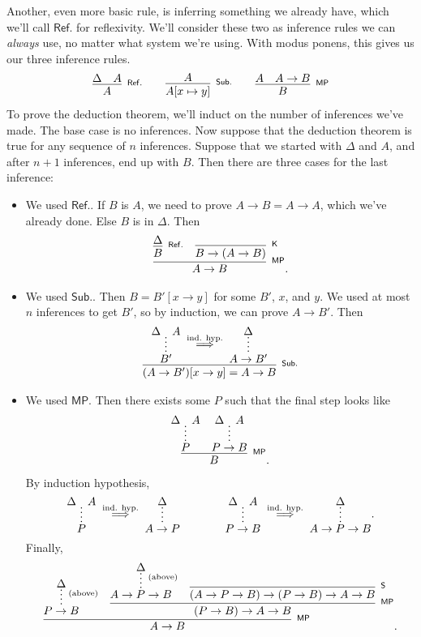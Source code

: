 \documentclass[11pt,paper=letter]{scrartcl}
\renewcommand{\sf}{\mathsf}
\newcommand{\vc}[1]{\vcenter{\hbox{#1}}}
\begin{document}
Another, even more basic rule, is inferring something we already have, which we'll call $\sf{Ref.}$ for reflexivity. We'll consider these two as inference rules we can \emph{always} use, no matter what system we're using. With modus ponens, this gives us our three inference rules.
\begin{align*}
\infer[^\sf{Ref.}]
{A}
{\Delta & A}
\qquad
\infer[^\sf{Sub.}]
{A[x \mapsto y]}
{A}
\qquad
\infer[^\sf{MP}]
{B}
{A & A \to B}
\end{align*}
To prove the deduction theorem, we'll induct on the number of inferences we've made. The base case is no inferences. Now suppose that the deduction theorem is true for any sequence of $n$ inferences. Suppose that we started with $\Delta$ and $A$, and after $n+1$ inferences, end up with $B$. Then there are three cases for the last inference:
\begin{itemize}
\item We used $\sf{Ref.}$. If $B$ is $A$, we need to prove $A \to B = A \to A$, which we've already done. Else $B$ is in $\Delta$. Then
\begin{align*}
\infer[^\sf{MP}]
{A \to B}
{
\infer[^\sf{Ref.}]
{B}
{\Delta}
&
\infer[^\sf{K}]
{B \to (A \to B)}
{}
}.
\end{align*}
\item We used $\sf{Sub.}$. Then $B = B'[x \to y]$ for some $B'$, $x$, and $y$. We used at most $n$ inferences to get $B'$, so by induction, we can prove $A \to B'$. Then
\begin{align*}
\infer[^\sf{Sub.}]
{(A \to B')[x \to y] = A \to B}
{
\vc{\infer*
{B'}
{\Delta & A}}
\;\overset{\text{ind. hyp.}}{\implies}\;
\vc{\infer*
{A \to B'}
{\Delta}}
}
\end{align*}
\item We used $\sf{MP}$. Then there exists some $P$ such that the final step looks like
\begin{align*}
\infer[^\sf{MP}]
{B}
{
\infer*
{P}
{\Delta & A}
&
\infer*
{P \to B}
{\Delta & A}
}.
\end{align*}
By induction hypothesis,
\begin{align*}
\vc{\infer*
{P}
{\Delta & A}}
\;\overset{\text{ind. hyp.}}{\implies}\;
\vc{\infer*
{A \to P}
{\Delta}}
\qquad\qquad
\vc{\infer*
{P \to B}
{\Delta & A}}
\;\overset{\text{ind. hyp.}}{\implies}\;
\vc{\infer*
{A \to P \to B}
{\Delta}}.
\end{align*}
Finally,
\begin{align*}
\infer[^\sf{MP}]
{A \to B}
{
\infer*[^\text{(above)}]{P \to B}{\Delta}
&
\infer[^\sf{MP}]{(P \to B) \to A \to B}{
\infer*[^\text{(above)}]{A \to P \to B}{\Delta}
&
\infer[^\sf{S}]{(A \to P \to B) \to (P \to B) \to A \to B}{}
}
}.
\end{align*}
\end{itemize}
\end{document}

